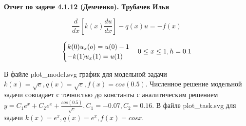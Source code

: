 \documentclass[a4paper, 12pt]{article}
\begin{document}
	\begin{center}
		\textbf{Отчет по задаче 4.1.12 (Демченко). Трубачев Илья}
	\end{center}

	\begin{equation*}
		\frac{d}{dx} [k(x) \frac{du}{dx}] - q(x)u = -f(x)
	\end{equation*}
	
	\begin{equation*}
	\begin{cases}
	k(0) u_x(o) = u(0) - 1 \\
	-k(1) u_x(1) = u(1)
	\end{cases} \\
	0 \leq x \leq 1, h = 0.1
	\end{equation*}
	
	
	В файле plot\_model.svg график для модельной задачи $k(x) = \sqrt{e}, q(x) = \sqrt{e}, f(x) = cos(0.5)$. Численное решение модельной задачи совпадает с точностью до константы с аналитическим решением $y = C_1 e^x + C_2 e^x + \frac{cos(0.5)}{\sqrt{e}}, C_1 = -0.07, C_2 = 0.16$. В файле plot\_task.svg для задачи $k(x) = e^x, q(x) = e^x, f(x) = cosx$.
\end{document}
